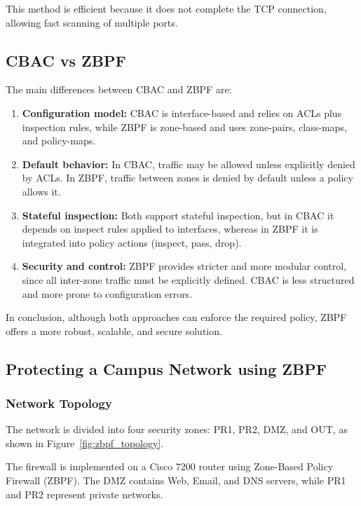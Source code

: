 \documentclass[12pt]{article}
\begin{document}
This method is efficient because it does not complete the TCP connection, allowing fast scanning of multiple ports.

\subsection{CBAC vs ZBPF}

The main differences between CBAC and ZBPF are:

\begin{enumerate}
    \item \textbf{Configuration model:}  
    CBAC is interface-based and relies on ACLs plus inspection rules, while ZBPF is zone-based and uses zone-pairs, class-maps, and policy-maps.

    \item \textbf{Default behavior:}  
    In CBAC, traffic may be allowed unless explicitly denied by ACLs. In ZBPF, traffic between zones is denied by default unless a policy allows it.

    \item \textbf{Stateful inspection:}  
    Both support stateful inspection, but in CBAC it depends on inspect rules applied to interfaces, whereas in ZBPF it is integrated into policy actions (inspect, pass, drop).

    \item \textbf{Security and control:}  
    ZBPF provides stricter and more modular control, since all inter-zone traffic must be explicitly defined. CBAC is less structured and more prone to configuration errors.
\end{enumerate}

In conclusion, although both approaches can enforce the required policy, ZBPF offers a more robust, scalable, and secure solution.

\newpage

\subsection{Protecting a Campus Network using ZBPF}

\subsubsection{Network Topology}

The network is divided into four security zones: PR1, PR2, DMZ, and OUT, as shown in Figure~\ref{fig:zbpf_topology}.  

The firewall is implemented on a Cisco 7200 router using Zone-Based Policy Firewall (ZBPF). The DMZ contains Web, Email, and DNS servers, while PR1 and PR2 represent private networks.
\end{document}

